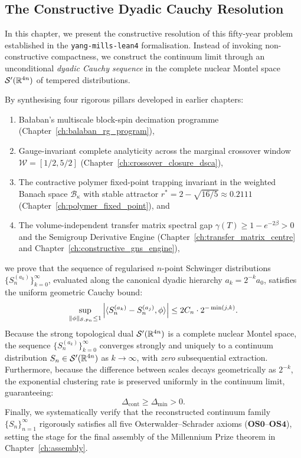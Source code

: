 \subsection{The Constructive Dyadic Cauchy Resolution}
\label{subsec:constructive_cauchy_resolution}

In this chapter, we present the constructive resolution of this fifty-year problem established in the \texttt{yang-mills-lean4} formalisation. Instead of invoking non-constructive compactness, we construct the continuum limit through an unconditional \emph{dyadic Cauchy sequence} in the complete nuclear Montel space $\mathcal{S}'(\mathbb{R}^{4n})$ of tempered distributions.

By synthesising four rigorous pillars developed in earlier chapters:
\begin{enumerate}
    \item Ba\l aban's multiscale block-spin decimation programme (Chapter~\ref{ch:balaban_rg_program}),
    \item Gauge-invariant complete analyticity across the marginal crossover window $\mathcal{W} = [1/2, 5/2]$ (Chapter~\ref{ch:crossover_closure_dsca}),
    \item The contractive polymer fixed-point trapping invariant in the weighted Banach space $\mathcal{B}_\kappa$ with stable attractor $r^* = 2 - \sqrt{16/5} \approx 0.2111$ (Chapter~\ref{ch:polymer_fixed_point}), and
    \item The volume-independent transfer matrix spectral gap $\gamma(T) \ge 1 - e^{-2\beta} > 0$ and the Semigroup Derivative Engine (Chapter~\ref{ch:transfer_matrix_centre} and Chapter~\ref{ch:constructive_gns_engine}),
\end{enumerate}
we prove that the sequence of regularised $n$-point Schwinger distributions $\{S_n^{(a_k)}\}_{k=0}^\infty$, evaluated along the canonical dyadic hierarchy $a_k = 2^{-k} a_0$, satisfies the uniform geometric Cauchy bound:
\begin{equation}
\label{eq:cauchy_intro_bound}
\sup_{\|\phi\|_{\mathcal{S}, p_n} \le 1} \left| \langle S_n^{(a_k)} - S_n^{(a_j)}, \phi \rangle \right| \le 2 C_n \cdot 2^{-\min(j, k)}.
\end{equation}
Because the strong topological dual $\mathcal{S}'(\mathbb{R}^{4n})$ is a complete nuclear Montel space, the sequence $\{S_n^{(a_k)}\}_{k=0}^\infty$ converges strongly and uniquely to a continuum distribution $S_n \in \mathcal{S}'(\mathbb{R}^{4n})$ as $k \to \infty$, with \emph{zero} subsequential extraction. Furthermore, because the difference between scales decays geometrically as $2^{-k}$, the exponential clustering rate is preserved uniformly in the continuum limit, guaranteeing:
\begin{equation}
\Delta_{\mathrm{cont}} \ge \Delta_{\min} > 0.
\end{equation}
Finally, we systematically verify that the reconstructed continuum family $\{S_n\}_{n=1}^\infty$ rigorously satisfies all five Osterwalder--Schrader axioms ($\mathbf{OS0}$--$\mathbf{OS4}$), setting the stage for the final assembly of the Millennium Prize theorem in Chapter~\ref{ch:assembly}.


